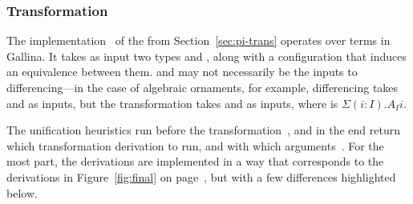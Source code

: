 \subsubsection{Transformation}
\label{sec:pi-details-trans}

The implementation~\href{https://github.com/uwplse/pumpkin-pi/blob/v2.0.0/plugin/src/automation/lift/lift.ml}{}
of the  from Section~\ref{sec:pi-trans} operates over terms in Gallina.
It takes as input two types \Aa and \B, along with a configuration that induces an equivalence between them.
\Aa and \B may not necessarily be the inputs to differencing---in the case of algebraic ornaments, for example,
differencing takes \Aa and \AI as inputs, but the transformation takes \Aa and \B as inputs,
where \B is $\Sigma (i : I).A_I i$.

The unification heuristics run before the transformation~\href{https://github.com/uwplse/pumpkin-pi/blob/v2.0.0/plugin/src/automation/lift/liftconfig.ml}{},
and in the end return which transformation derivation to run,
and with which arguments~\href{https://github.com/uwplse/pumpkin-pi/blob/v2.0.0/plugin/src/automation/lift/liftrules.ml}{}.
For the most part, the derivations are implemented in a way that corresponds to the derivations in Figure~\ref{fig:final}
on page~\pageref{fig:final}, but with a few differences highlighted below.

